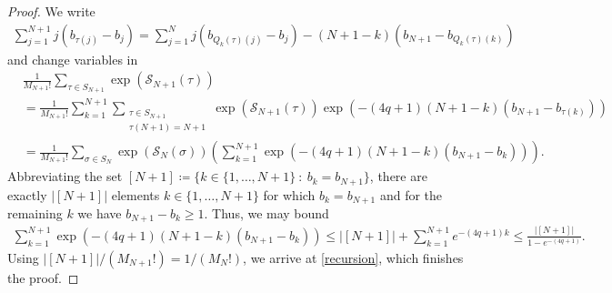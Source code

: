 \documentclass[letterpaper, DIV=17]{scrartcl}
\numberwithin{equation}{section}
\theoremstyle{definition}
\begin{document}
\begin{proof}
	We write
	\begin{align*}
		\sum_{j=1}^{N+1} j (b_{\tau(j)}-b_j)
		= \sum_{j=1}^N j (b_{Q_k(\tau)(j)}-b_j) -(N+1-k) (b_{N+1}-b_{Q_k(\tau)(k)})
	\end{align*}
	and change variables in
	\begin{align*}
		&\frac{1}{M_{N+1}!} \sum_{\tau\in S_{N+1}} \exp\left(\mathcal{S}_{N+1}(\tau)\right) \\
		&=\frac{1}{M_{N+1}!} \sum_{k=1}^{N+1} \sum_{\substack{\tau\in S_{N+1} \\ \tau(N+1)=N+1}} \exp\left(\mathcal{S}_{N+1}(\tau)\right) \exp\left(-(4q+1)(N+1-k) (b_{N+1}-b_{\tau(k)})\right) \\
		&=\frac{1}{M_{N+1}!} \sum_{\sigma\in S_N} \exp\left(\mathcal{S}_N(\sigma)\right)\left( \sum_{k=1}^{N+1} \exp\left(-(4q+1)(N+1-k)(b_{N+1}-b_k)\right)\right).
	\end{align*}
	Abbreviating the set $[N+1]\coloneqq \{k\in \{1, \dots, N+1\} \ : \ b_k=b_{N+1}\}$, 
	 there are exactly $\vert [N+1]\vert$ elements $k\in \{1, \dots, N+1\}$ for which $b_k= b_{N+1}$ and for the remaining $k$ we have $b_{N+1}-b_k\geq 1$. Thus, we may bound 
	\begin{align*}
		\sum_{k=1}^{N+1} \exp\left(-(4q+1)(N+1-k)(b_{N+1}-b_k)\right)
		\leq \vert [N+1]\vert + \sum_{k=1}^{N+1} e^{-(4q+1)k}
		\leq  \frac{\vert [N+1]\vert}{1-e^{-(4q+1)}}.
	\end{align*}
	Using $\vert [N+1]\vert/(M_{N+1}!)=1/(M_N!)$, we arrive at \eqref{recursion}, which finishes the proof.
\end{proof} 
\end{document}

